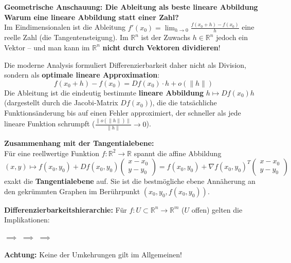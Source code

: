 \begin{remark}
    \textbf{Geometrische Anschauung: Die Ableitung als beste lineare Abbildung} \\
    \textbf{Warum eine lineare Abbildung statt einer Zahl?} \\
    Im Eindimensionalen ist die Ableitung $f'(x_0) = \lim_{h \to 0} \frac{f(x_0+h) - f(x_0)}{h}$ eine reelle Zahl (die Tangentensteigung). Im $\mathbb{R}^n$ ist der Zuwachs $h \in \mathbb{R}^n$ jedoch ein Vektor – und man kann im $\mathbb{R}^n$ \textbf{nicht durch Vektoren dividieren}!
    
    Die moderne Analysis formuliert Differenzierbarkeit daher nicht als Division, sondern als \textbf{optimale lineare Approximation}:
    $$ f(x_0 + h) - f(x_0) = Df(x_0) \cdot h + o(\|h\|) $$
    Die Ableitung ist die eindeutig bestimmte \textbf{lineare Abbildung} $h \mapsto Df(x_0) h$ (dargestellt durch die Jacobi-Matrix $Df(x_0)$), die die tatsächliche Funktionsänderung bis auf einen Fehler approximiert, der schneller als jede lineare Funktion schrumpft ($\frac{\|o(\|h\|)\|}{\|h\|} \to 0$).

    \textbf{Zusammenhang mit der Tangentialebene:} \\
    Für eine reellwertige Funktion $f: \mathbb{R}^2 \to \mathbb{R}$ spannt die affine Abbildung
    $$ (x, y) \mapsto f(x_0, y_0) + Df(x_0, y_0) \begin{pmatrix} x - x_0 \\ y - y_0 \end{pmatrix} = f(x_0, y_0) + \nabla f(x_0, y_0)^T \begin{pmatrix} x - x_0 \\ y - y_0 \end{pmatrix} $$
    exakt die \textbf{Tangentialebene} auf. Sie ist die bestmögliche ebene Annäherung an den gekrümmten Graphen im Berührpunkt $(x_0, y_0, f(x_0, y_0))$.
\end{remark}

\begin{remark}
    \textbf{Differenzierbarkeitshierarchie:} Für $f: U \subset \mathbb{R}^n \to \mathbb{R}^m$ ($U$ offen) gelten die Implikationen:
    \begin{center}
         $\implies$  $\implies$  $\implies$ 
    \end{center}
    \textbf{Achtung:} Keine der Umkehrungen gilt im Allgemeinen!
\end{remark}

